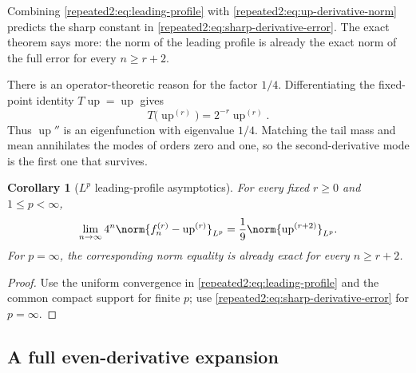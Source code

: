 \documentclass[11pt,oneside]{article}
\newtheorem{corollary}[corollary]{Corollary}
\theoremstyle{definition}
\theoremstyle{remark}
\newcommand{\Up}{\operatorname{up}}
\begin{document}
Combining \eqref{repeated2:eq:leading-profile} with \eqref{repeated2:eq:up-derivative-norm} predicts the sharp
constant in \eqref{repeated2:eq:sharp-derivative-error}.  The exact theorem says more: the norm of the
leading profile is already the exact norm of the full error for every $n\ge r+2$.

There is an operator-theoretic reason for the factor $1/4$.  Differentiating the fixed-point
identity $T\Up=\Up$ gives
\begin{equation}
 T\bigl(\Up^{(r)}\bigr)=2^{-r}\Up^{(r)}.
 \label{repeated2:eq:T-eigenfunctions}
\end{equation}
Thus $\Up''$ is an eigenfunction with eigenvalue $1/4$.  Matching the tail mass and mean
annihilates the modes of orders zero and one, so the second-derivative mode is the first one
that survives.

\begin{corollary}[$L^p$ leading-profile asymptotics]
\label{repeated2:cor:Lp}
For every fixed $r\ge0$ and $1\le p<\infty$,
\begin{equation}
 \lim_{n\to\infty}4^n
 \norm{f_n^{(r)}-\Up^{(r)}}_{L^p}
 =\frac19\norm{\Up^{(r+2)}}_{L^p}.
 \label{repeated2:eq:Lp-asymptotic}
\end{equation}
For $p=\infty$, the corresponding norm equality is already exact for every
$n\ge r+2$.
\end{corollary}

\begin{proof}
Use the uniform convergence in \eqref{repeated2:eq:leading-profile} and the common compact
support for finite $p$; use \eqref{repeated2:eq:sharp-derivative-error} for $p=\infty$.
\end{proof}

\subsection{A full even-derivative expansion}
\end{document}
